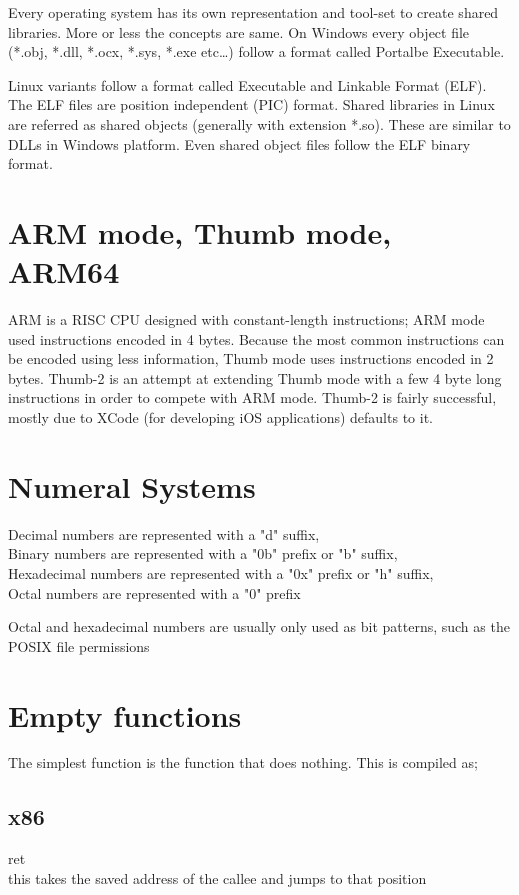 \documentclass[11pt, a4paper, draft]{article}
\begin{document}
	
	Every operating system has its own representation and tool-set to create shared libraries. More or less the concepts are same. On Windows every object file (*.obj, *.dll, *.ocx, *.sys, *.exe etc…) follow a format called Portalbe Executable.

Linux variants follow a format called Executable and Linkable Format (ELF). The ELF files are position independent (PIC) format. Shared libraries in Linux are referred as shared objects (generally with extension *.so). These are similar to DLLs in Windows platform. Even shared object files follow the ELF binary format.

	\section*{ARM mode, Thumb mode, ARM64}
	ARM is a RISC CPU designed with constant-length instructions; ARM mode used instructions encoded in 4 bytes. Because the most common instructions can be encoded using less information, Thumb mode uses instructions encoded in 2 bytes. Thumb-2 is an attempt at extending Thumb mode with a few 4 byte long instructions in order to compete with ARM mode. Thumb-2 is fairly successful, mostly due to XCode (for developing iOS applications) defaults to it.
	
	\section*{Numeral Systems}
	Decimal numbers are represented with a "d" suffix,\\
	Binary numbers are represented with a "0b" prefix or "b" suffix,\\
	Hexadecimal numbers are represented with a "0x" prefix or "h" suffix,\\
	Octal numbers are represented with a "0" prefix
	
	Octal and hexadecimal numbers are usually only used as bit patterns, such as the POSIX file permissions
	
	
	\section*{Empty functions}
	The simplest function is the function that does nothing.
	This is compiled as;
	
		\subsection*{x86}
		ret\\
		this takes the saved address of the callee and jumps to that position
		
\end{document}
